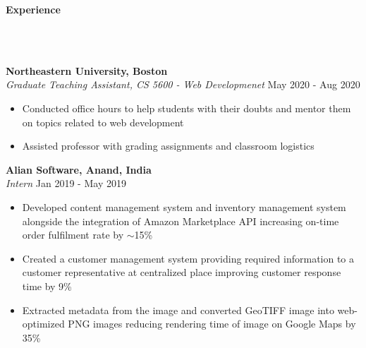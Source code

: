 \documentclass[]{article}
\newcommand{\lineunder} {
    \vspace*{-8pt} \\
    \hrulefill \\
}
\newcommand{\header} [1] {
    {\vspace*{6pt} \fontsize{12}{12}\selectfont \textbf{#1}}
     \lineunder
}
\begin{document}
\header{Experience}
\vspace{1mm}

\hspace{1mm}
\textbf{Northeastern University, Boston}\\
\hspace{1mm}
\textit{Graduate Teaching Assistant, CS 5600 - Web Developmenet} \hfill May 2020 - Aug 2020\\
\vspace{-2mm}
\begin{itemize}
    \setlength\itemsep{0.2mm}
    \item Conducted office hours to help students with their doubts and mentor them on topics related to web development
    \item Assisted professor with grading assignments and classroom logistics  
\end{itemize}

\hspace{1mm}
\textbf{Alian Software, Anand, India}\\
\hspace{1mm}
\textit{Intern} \hfill Jan 2019 - May 2019\\
\vspace{-2mm}
\begin{itemize}
    \setlength\itemsep{0.2mm}
    \item Developed content management system and inventory management system alongside the integration of Amazon Marketplace API increasing on-time order fulfilment rate by $\sim$15\%
	\item Created a customer management system providing required information to a customer representative at centralized place improving customer response time by 9\%
	\item Extracted metadata from the image and converted GeoTIFF image into web-optimized PNG images reducing rendering time of image on Google Maps by 35\%
\end{itemize}

\end{document}
